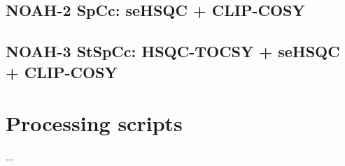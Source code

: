 \small
\singlespacing

\subsection{NOAH-2 SpCc: seHSQC + CLIP-COSY}


\subsection{NOAH-3 StSpCc: HSQC-TOCSY + seHSQC + CLIP-COSY}


\normalsize

\section{Processing scripts}

...
